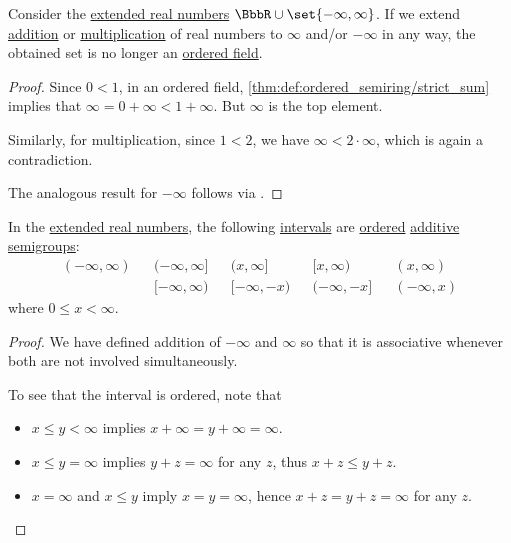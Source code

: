 \begin{proposition}\label{thm:extended_real_numbers_are_not_ordered_field}
  Consider the \hyperref[def:extended_real_numbers]{extended real numbers} \( \BbbR \cup \set{ -\infty, \infty } \). If we extend \hyperref[def:real_number_arithmetic/addition]{addition} or \hyperref[def:real_number_arithmetic/multiplication]{multiplication} of real numbers to \( \infty \) and/or \( -\infty \) in any way, the obtained set is no longer an \hyperref[def:ordered_semiring]{ordered field}.
\end{proposition}
\begin{proof}
  Since \( 0 < 1 \), in an ordered field, \cref{thm:def:ordered_semiring/strict_sum} implies that \( \infty = 0 + \infty < 1 + \infty \). But \( \infty \) is the top element.

  Similarly, for multiplication, since \( 1 < 2 \), we have \( \infty < 2 \cdot \infty \), which is again a contradiction.

  The analogous result for \( -\infty \) follows via .
\end{proof}

\begin{proposition}\label{thm:extended_real_semigroup}
  In the \hyperref[def:extended_real_numbers]{extended real numbers}, the following \hyperref[def:order_interval/closed]{intervals} are \hyperref[def:ordered_semigroup]{ordered} \hyperref[def:additive_semigroup]{additive semigroups}:
  \begin{align*}
    (-\infty, \infty) && (-\infty, \infty] && (x, \infty]   && [x, \infty)   && (x, \infty) \\
                      && [-\infty, \infty) && [-\infty, -x) && (-\infty, -x] && (-\infty, x)
  \end{align*}
  where \( 0 \leq x < \infty \).
\end{proposition}
\begin{proof}
  We have defined addition of \( -\infty \) and \( \infty \) so that it is associative whenever both are not involved simultaneously.

  To see that the interval is ordered, note that
  \begin{itemize}
    \item \( x \leq y < \infty \) implies \( x + \infty = y + \infty = \infty \).
    \item \( x \leq y = \infty \) implies \( y + z = \infty \) for any \( z \), thus \( x + z \leq y + z \).
    \item \( x = \infty \) and \( x \leq y \) imply \( x = y = \infty \), hence \( x + z = y + z = \infty \) for any \( z \).
  \end{itemize}
\end{proof}


